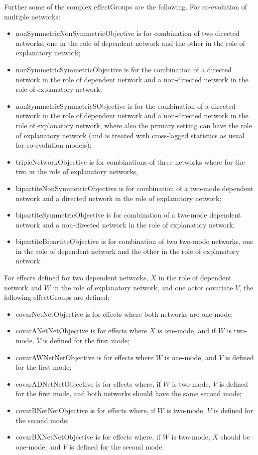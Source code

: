 \documentclass[a4paper,fleqn,11pt]{article}
\newcommand{\+}{\, + \,}
\newcommand{\sfn}[1]{\textsf{#1}}
\begin{document}
Further some of the complex effectGroups are the following.
For co-evolution of multiple networks:
\begin{itemize}
\item \sfn{nonSymmetricNonSymmetricObjective} is for combination of two
    directed networks, one in the role of dependent network and the other
    in the role of explanatory network;
\item \sfn{nonSymmetricSymmetricObjective} is for the combination of a
    directed network in the role of dependent network and a non-directed network
    in the role of explanatory network;
\item \sfn{nonSymmetricSymmetricSObjective} is for the combination of a
    directed network in the role of dependent network and a non-directed network
    in the role of explanatory network, where also the primary setting
    can have the role of explanatory network (and is treated with cross-lagged
    statistics as usual for co-evolution models);
\item \sfn{tripleNetworkObjective} is for combinations
    of three networks where for the two in the role of explanatory networks,
\item \sfn{bipartiteNonSymmetricObjective} is for combination of
    a two-mode dependent network and a directed network
    in the role of explanatory network;
\item \sfn{bipartiteSymmetricObjective} is for combination of
    a two-mode dependent network and a non-directed network
    in the role of explanatory network;
\item \sfn{bipartiteBipartiteObjective} is for combination of two
    two-mode networks, one in the role of dependent network and the other
    in the role of explanatory network.
\end{itemize}
\medskip

For effects defined for two dependent networks,
$X$ in the role of dependent network and $W$ in the role
of explanatory network, and one actor covariate $V$,
the following effectGroups are defined:
\begin{itemize}
\item \sfn{covarNetNetObjective} is for effects where
        both networks are one-mode;
\item \sfn{covarANetNetObjective} is for effects where
        $X$ is one-mode, and if $W$ is two-mode, 
        $V$ is defined for the first mode;
\item \sfn{covarAWNetNetObjective} is for effects where
        $W$ is one-mode, and $V$ is defined for the first mode;
\item \sfn{covarADNetNetObjective} is for effects where,
        if $W$ is two-mode, $V$ is defined for the first mode,
        and both networks should have the same second mode;
\item \sfn{covarBNetNetObjective} is for effects where,
        if $W$ is two-mode,
         $V$ is defined for the second mode;
\item \sfn{covarBXNetNetObjective} is for effects where,
        if $W$ is two-mode,
        $X$ should be one-mode, and $V$ is defined for the second mode.
\end{itemize}
\medskip
\end{document}
